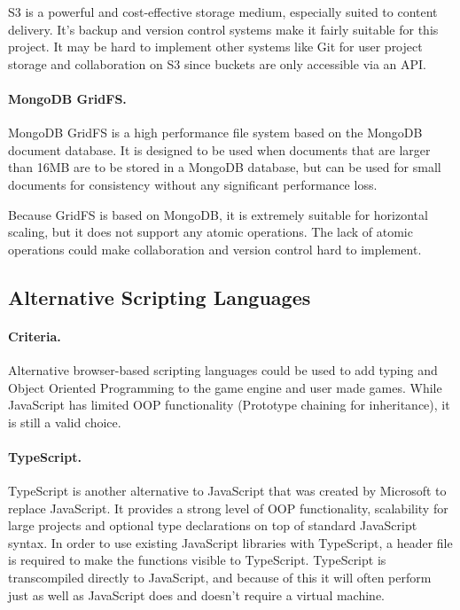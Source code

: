 S3 is a powerful and cost-effective storage medium, especially suited to content delivery. It's backup and version control systems make it fairly suitable for this project.\cite{awss3} It may be hard to implement other systems like Git for user project storage and collaboration on S3 since buckets are only accessible via an API.

\paragraph{MongoDB GridFS.}
MongoDB GridFS is a high performance file system based on the MongoDB document database. It is designed to be used when documents that are larger than 16MB are to be stored in a MongoDB database, but can be used for small documents for consistency without any significant performance loss.\cite{gridfs}

Because GridFS is based on MongoDB, it is extremely suitable for horizontal scaling, but it does not support any atomic operations.\cite{gridfsatomic} The lack of atomic operations could make collaboration and version control hard to implement.

\subsection{Alternative Scripting Languages}
\paragraph{Criteria.}
Alternative browser-based scripting languages could be used to add typing and Object Oriented Programming to the game engine and user made games. While JavaScript has limited OOP functionality (Prototype chaining for inheritance), it is still a valid choice.

\paragraph{TypeScript.}
TypeScript is another alternative to JavaScript that was created by Microsoft to replace JavaScript. It provides a strong level of OOP functionality, scalability for large projects and optional type declarations on top of standard JavaScript syntax.\cite{typescript} In order to use existing JavaScript libraries with TypeScript, a header file is required to make the functions visible to TypeScript. TypeScript is transcompiled directly to JavaScript, and because of this it will often perform just as well as JavaScript does and doesn't require a virtual machine.

